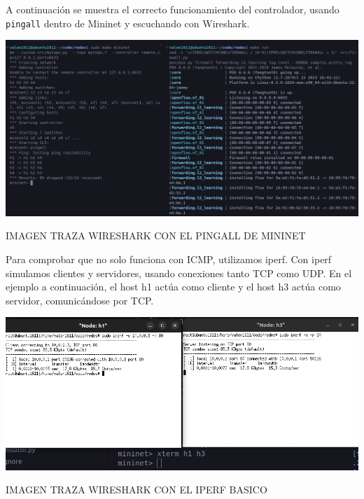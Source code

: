 \documentclass{article}
\begin{document}
A continuación se muestra el correcto funcionamiento del controlador, usando \texttt{pingall} dentro de Mininet y escuchando con Wireshark.

\begin{center}
    \includegraphics[scale=0.23]{mininet_pingall.png}
\end{center}

IMAGEN TRAZA WIRESHARK CON EL PINGALL DE MININET
\begin{center}
\end{center}

Para comprobar que no solo funciona con ICMP, utilizamos iperf. Con iperf simulamos clientes y servidores, usando conexiones tanto TCP como UDP. En el ejemplo a continuación, el host h1 actúa como cliente y el host h3 actúa como servidor, comunicándose por TCP.

\begin{center}
\includegraphics[scale=0.37]{mininet_iperf_basico.png}
\end{center}

IMAGEN TRAZA WIRESHARK CON EL IPERF BASICO
\begin{center}
\end{center}

\newpage
\end{document}
